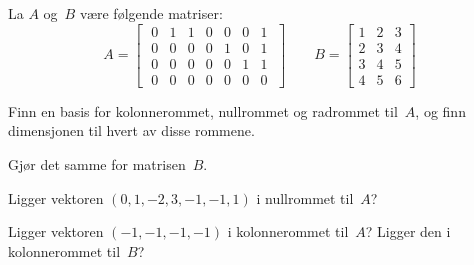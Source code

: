 

\begin{oppgave}
La $A$ og~$B$ være følgende matriser:
\[
A =
\begin{bmatrix}
\;0 & 1 & 1 & 0 & 0 & 0 & 1\;\\
\;0 & 0 & 0 & 0 & 1 & 0 & 1\;\\
\;0 & 0 & 0 & 0 & 0 & 1 & 1\;\\
\;0 & 0 & 0 & 0 & 0 & 0 & 0\;
\end{bmatrix}
\qquad
B =
\begin{bmatrix}
 1 & 2 & 3\\
 2 & 3 & 4\\
 3 & 4 & 5\\
 4 & 5 & 6
\end{bmatrix}
\]
\begin{punkt}
Finn en basis for kolonnerommet, nullrommet og radrommet til~$A$, og
finn dimensjonen til hvert av disse rommene.
\end{punkt}
\begin{punkt}
Gjør det samme for matrisen~$B$.
\end{punkt}
\begin{punkt}
Ligger vektoren $(0, 1, -2, 3, -1, -1, 1)$ i nullrommet til~$A$?
\end{punkt}
\begin{punkt}
Ligger vektoren $(-1, -1, -1, -1)$ i kolonnerommet til~$A$?  Ligger den
i kolonnerommet til~$B$?
\end{punkt}



\end{oppgave}
